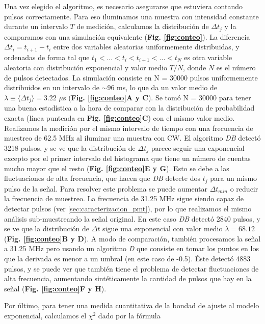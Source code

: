 Una vez elegido el algoritmo, es necesario asegurarse que estuviera contando pulsos correctamente.
Para eso iluminamos una muestra con intensidad constante durante un intervalo $T$ de medición, calculamos la distribución de $\Delta t_j$ y la comparamos con una simulación equivalente (\textbf{Fig. \ref{fig:conteo}}).
La diferencia $\Delta t_i = t_{i+1} - t_i$ entre dos variables aleatorias uniformemente distribuidas, y ordenadas de forma tal que $t_1 < ... < t_i < t_{i+1} < ... < t_N $ es otra variable aleatoria con distribución exponencial y valor medio $T/N$, donde $N$ es el número de pulsos detectados.
La simulación consiste en N = 30000 pulsos uniformemente distribuidos en un intervalo de $\sim 96$ ms, lo que da un valor medio de $\lambda \equiv \langle \Delta t_j \rangle = 3.22$ $\mu$s (\textbf{Fig. \ref{fig:conteo}A y C}).
Se tomó N = 30000 para tener una buena estadística a la hora de comparar con la distribución de probabilidad exacta (línea punteada en \textbf{Fig. \ref{fig:conteo}C}) con el mismo valor medio.
Realizamos la medición por el mismo intervalo de tiempo con una frecuencia de muestreo de 62.5 MHz al iluminar una muestra con CW.
El algoritmo \textit{DB} detectó 3218 pulsos, y se ve que la distribución de $\Delta t_j$ parece seguir una exponencial excepto por el primer intervalo del histograma que tiene un número de cuentas mucho mayor que el resto (\textbf{Fig. \ref{fig:conteo}E y G}).
Esto se debe a las fluctuaciones de alta frecuencia, que hacen que \textit{DB} detecte dos $t_j$ para un mismo pulso de la señal. 
Para resolver este problema se puede aumentar $\Delta t_{min}$ o reducir la frecuencia de muestreo.
La frecuencia de 31.25 MHz sigue siendo capaz de detectar pulsos (ver \ref{sec:caracterizacion_pmt}), por lo que realizamos el mismo análisis sub-muestreando la señal original.
En este caso \textit{DB} detectó 2840 pulsos, y se ve que la distribución de $\Delta t$ sigue una exponencial con valor medio $\lambda = 68.12$ (\textbf{Fig. \ref{fig:conteo}B y D}).
A modo de comparación, también procesamos la señal a 31.25 MHz pero usando un algoritmo \textit{D} que consiste en tomar los puntos en los que la derivada es menor a un umbral (en este caso de -0.5).
Éste detectó 4883 pulsos, y se puede ver que también tiene el problema de detectar fluctuaciones de alta frecuencia, aumentando sintéticamente la cantidad de pulsos que hay en la señal (\textbf{Fig. \ref{fig:conteo}F y H}).

Por último, para tener una medida cuantitativa de la bondad de ajuste al modelo exponencial, calculamos el $\chi^2$ dado por la fórmula 


